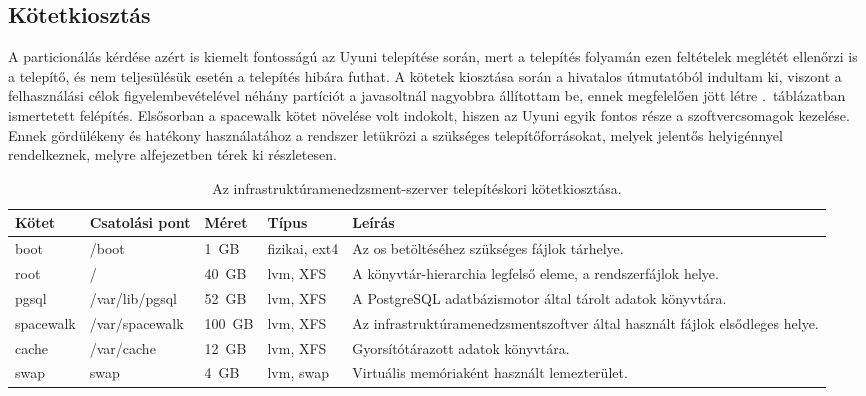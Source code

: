 \subsection{Kötetkiosztás}
A particionálás kérdése azért is kiemelt fontosságú az Uyuni telepítése során, mert a telepítés folyamán ezen feltételek meglétét ellenőrzi is a telepítő, és nem teljesülésük esetén a telepítés hibára futhat. A kötetek kiosztása során a hivatalos útmutatóból indultam ki, viszont a felhasználási célok figyelembevételével néhány partíciót a javasoltnál nagyobbra állítottam be, ennek megfelelően jött létre .~táblázatban ismertetett felépítés. Elsősorban a spacewalk kötet növelése volt indokolt, hiszen az Uyuni egyik fontos része a szoftvercsomagok kezelése. Ennek gördülékeny és hatékony használatához a rendszer letükrözi a szükséges telepítőforrásokat, melyek jelentős helyigénnyel rendelkeznek, melyre  alfejezetben térek ki részletesen.

\begin{table}[h]
	\setlength{\tabcolsep}{5pt}
	\renewcommand{\arraystretch}{1.3}
	\centering
	\begin{tabular}{||l l l l m{5.3cm}||}
		\hline
		Kötet & Csatolási pont & Méret & Típus & Leírás\\
		\hline\hline
		boot & /boot & 1~GB & fizikai, ext4 & Az \acrshort{os} betöltéséhez szükséges fájlok tárhelye. \\
		\hline
		root & / & 40~GB & \acrshort{lvm}, XFS & A könyvtár-hierarchia legfelső eleme, a rendszerfájlok helye. \\
		\hline
		pgsql & /var/lib/pgsql & 52~GB & \acrshort{lvm}, XFS & A PostgreSQL adatbázismotor által tárolt adatok könyvtára. \\
		\hline
		spacewalk & /var/spacewalk & 100~GB & \acrshort{lvm}, XFS & Az infrastruktúramenedzsment\Hyphdash szoftver által használt fájlok elsődleges helye. \\
		\hline
		cache & /var/cache & 12~GB & \acrshort{lvm}, XFS & Gyorsítótárazott adatok könyvtára. \\
		\hline
		swap & swap & 4~GB & \acrshort{lvm}, swap & Virtuális memóriaként használt lemezterület. \\
		\hline
	\end{tabular}
	\caption{Az infrastruktúramenedzsment-szerver telepítéskori kötetkiosztása.}
	\label{tab:uyuni-partitioning}
\end{table}

